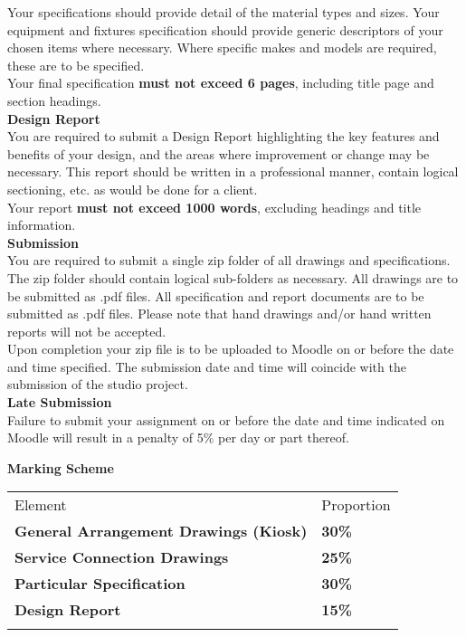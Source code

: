 Your specifications should provide detail of the material types and sizes.  Your equipment and fixtures specification should provide generic descriptors of your chosen items where necessary.  Where specific makes and models are required, these are to be specified. \\

Your final specification \textbf{must not exceed 6 pages}, including title page and section headings.\\

\textbf{Design Report}\\
You are required to submit a Design Report highlighting the key features and benefits of your design, and the areas where improvement or change may be necessary.  This report should be written in a professional manner, contain logical sectioning, etc. as would be done for a client.\\  Your report \textbf{must not exceed 1000 words}, excluding headings and title information.\\


\textbf{Submission}\\
You are required to submit a single zip folder of all drawings and specifications.  The zip folder should contain logical sub-folders as necessary.  All drawings are to be submitted as .pdf files.  All specification and report documents are to be submitted as .pdf files.  Please note that hand drawings and/or hand written reports will not be accepted.\\

Upon completion your zip file is to be uploaded to Moodle on or before the date and time specified.  The submission date and time will coincide with the submission of the studio project.\\  

\textbf{Late Submission}\\
Failure to submit your assignment on or before the date and time indicated on Moodle will result in a penalty of 5\% per day or part thereof.  

\vspace{0.5cm}
\textbf{Marking Scheme}\\

\begin{table}[h!]
     \begin{center}
     \begin{tabular}{p{8cm}  p{2cm} }
     \toprule
      \textbf\large{Element} & \textbf\large{Proportion} \\ 
    \cmidrule(r){1-1}\cmidrule(lr){2-2}
      \textbf{General Arrangement Drawings (Kiosk)} & \textbf{30\%}\\
      \textbf{Service Connection Drawings} & \textbf{25\%}\\
      \textbf{Particular Specification} & \textbf{30\%}\\      
      \textbf{Design Report} & \textbf{15\%}\\     
      \\ \bottomrule
      \end{tabular}
      \label{tbl:markSchemeAsmt4}
      \end{center}
 \end{table}

